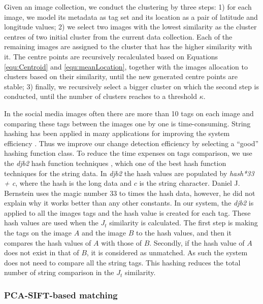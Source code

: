 \documentclass[runningheads,a4paper]{llncs}
\newcommand{\eat}[1]{}
\begin{document}
Given an image collection, we conduct the clustering by three steps: 
1) for each image, we model its metadata as tag set and its location as a pair of latitude and longitude values;
2) we select two images with the lowest similarity as the cluster centres of two initial cluster from the current data collection. Each of the remaining images are assigned to the cluster that has the higher similarity with it. The centre points are recursively recalculated based on Equations \ref{equ:Centroid} and \ref{equ:meanLocation}, together with the images allocation to clusters based on their similarity, until the new generated centre points are stable;
3) finally, we recursively select a bigger cluster on which the second step is conducted, until the number of clusters reaches to a threshold $\kappa$.

In the social media images often there are more than 10 tags on each image and comparing these tags between the images one by one is time-consuming. 
String hashing has been applied in many applications for improving the system efficiency \cite{DBLP:conf/sigmod/ZhouCZCHW15}. 
Thus we improve our change detection efficiency by selecting a ``good'' hashing function class. 
To reduce the time expenses on tags comparison, we use the \textit{djb2} hash function techniques \cite{MartínezFE14},
which one of the best hash function techniques for the string data. 
In \textit{djb2} the hash values are populated by \textit{hash*33 + c}, 
where the hash is the long data and $c$ is the string character. 
Daniel J. Bernstein uses the magic number 33 to times the hash data, however, he did not explain why it works better than any other constants.
In our system, the \textit{djb2} is applied to all the images tags and the hash value is created for each tag. These hash values are used when the $J_t$ similarity is calculated. The first step is making the tags on the image $A$ and the image $B$ to the hash values, and then it compares the hash values of $A$ with those of $B$. Secondly, if the hash value of $A$ does not exist in that of $B$, it is considered as unmatched. As such the system does not need to compare all the string tags. This hashing reduces the total number of string comparison in the $J_t$ similarity.

\eat{
Para 1: how to choose cluster algorithm, and extend it to SIS similarity

Para 2: how to index social images for quick clustering
}

\subsubsection{PCA-SIFT-based matching} 
\end{document}
